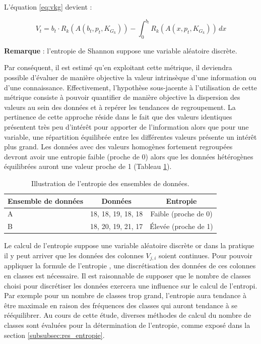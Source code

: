 L'équation \ref{eq:vkg} devient :

\begin{equation} \label{eq:vkg_h}
    V_t = b_t \cdot R_k(A(b_t,p_t,K_{G_k})) -\int_{0}^{b_t} R_k(A(x,p_t,K_{G_k})) \, dx
\end{equation}

\textbf{Remarque} : l'entropie de Shannon suppose une variable aléatoire discrète.

Par conséquent, il est estimé qu'en exploitant cette métrique, il deviendra possible d'évaluer de manière objective la valeur intrinsèque d'une information ou d'une connaissance. Effectivement, l'hypothèse sous-jacente à l'utilisation de cette métrique consiste à pouvoir quantifier de manière objective la dispersion des valeurs au sein des données et à repérer les tendances de regroupement. La pertinence de cette approche réside dans le fait que des valeurs identiques présentent très peu d'intérêt pour apporter de l'information alors que pour une variable, une répartition équilibrée entre les différentes valeurs présente un intérêt plus grand. Les données avec des valeurs homogènes fortement regroupées devront avoir une entropie faible (proche de 0) alors que les données hétérogènes équilibrées auront une valeur proche de 1 (Tableau \ref{table:exemple_entropie}).

\begin{table}[h]
\centering
\begin{tabular}{l c c}
\toprule
Ensemble de données & Données & Entropie \\
\midrule
A & 18, 18, 19, 18, 18 & Faible (proche de 0) \\
B & 18, 20, 19, 21, 17 & Élevée (proche de 1) \\
\bottomrule
\end{tabular}
\caption{Illustration de l'entropie des ensembles de données.} \label{table:exemple_entropie}
\end{table}

Le calcul de l'entropie suppose une variable aléatoire discrète or dans la pratique il y peut arriver que les données des colonnes $V_{j,i}$ soient continues. Pour pouvoir appliquer la formule de l'entropie , une discrétisation des données de ces colonnes en classes est nécessaire. Il est raisonnable de supposer que le nombre de classes choisi pour discrétiser les données exercera une influence sur le calcul de l'entropi. Par exemple pour un nombre de classes trop grand, l'entropie aura tendance à être maximale en raison des fréquences des classes qui auront tendance à se rééquilibrer. Au cours de cette étude, diverses méthodes de calcul du nombre de classes sont évaluées pour la détermination de l'entropie, comme exposé dans la section \ref{subsubsec:res_entropie}.

